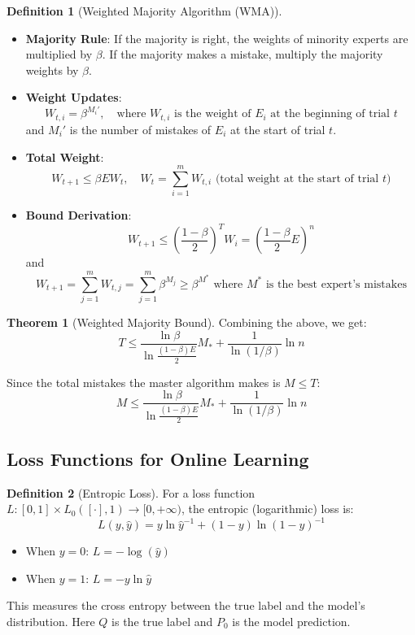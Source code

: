 \documentclass[12pt,a4paper]{article}
\theoremstyle{definition}
\newtheorem{definition}{Definition}[section]
\newtheorem{theorem}{Theorem}[section]
\begin{document}
\begin{definition}[Weighted Majority Algorithm (WMA)]
\begin{itemize}
    \item \textbf{Majority Rule}: If the majority is right, the weights of minority experts are multiplied by $\beta$. If the majority makes a mistake, multiply the majority weights by $\beta$.
    
    \item \textbf{Weight Updates}: 
    \[
    W_{t,i} = \beta^{M_i'}, \quad \text{where } W_{t,i} \text{ is the weight of } E_i \text{ at the beginning of trial } t
    \]
    and $M_i'$ is the number of mistakes of $E_i$ at the start of trial $t$.
    
    \item \textbf{Total Weight}: 
    \[
    W_{t+1} \leq \beta E W_t, \quad W_t = \sum_{i=1}^m W_{t,i} \text{ (total weight at the start of trial } t\text{)}
    \]
    
    \item \textbf{Bound Derivation}:
    \[
    W_{t+1} \leq \left(\frac{1-\beta}{2}\right)^T W_i = \left(\frac{1-\beta}{2} E\right)^n
    \]
    and 
    \[
    W_{t+1} = \sum_{j=1}^m W_{t,j} = \sum_{j=1}^m \beta^{M_j} \geq \beta^{M^*} \text{ where } M^* \text{ is the best expert's mistakes}
    \]
\end{itemize}
\end{definition}

\begin{theorem}[Weighted Majority Bound]
Combining the above, we get:
\[
T \leq \frac{\ln \beta}{\ln \frac{(1-\beta) E}{2}} M_* + \frac{1}{\ln(1/\beta)} \ln n
\]

Since the total mistakes the master algorithm makes is $M \leq T$:
\[
M \leq \frac{\ln \beta}{\ln \frac{(1-\beta) E}{2}} M_* + \frac{1}{\ln(1/\beta)} \ln n
\]
\end{theorem}

\subsection{Loss Functions for Online Learning}

\begin{definition}[Entropic Loss]
For a loss function $L: [0,1] \times L_0([\cdot], 1) \to [0, +\infty)$, the entropic (logarithmic) loss is:
\[
L(y, \hat{y}) = y \ln \hat{y}^{-1} + (1-y) \ln(1-\hat{y})^{-1}
\]
\begin{itemize}
    \item When $y = 0$: $L = -\log(\hat{y})$
    \item When $y = 1$: $L = -y \ln \hat{y}$
\end{itemize}
This measures the cross entropy between the true label and the model's distribution. Here $Q$ is the true label and $P_0$ is the model prediction.
\end{definition}
\end{document}
